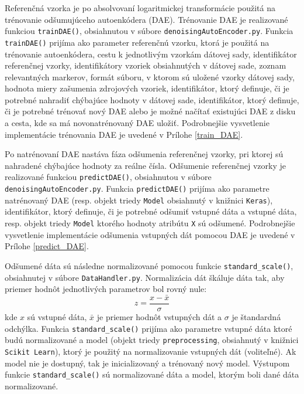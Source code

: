 Referenčná vzorka je po absolvovaní logaritmickej transformácie použitá na trénovanie odšumujúceho autoenkódera (DAE). Trénovanie DAE je realizované funkciou \texttt{trainDAE()}, obsiahnutou v súbore \texttt{denoisingAutoEncoder.py}. Funkcia \texttt{trainDAE()} prijíma ako parameter referenčnú vzorku, ktorá je použitá na trénovanie autoenkódera, cestu k jednotlivým vzorkám dátovej sady, identifikátor referenčnej vzorky, identifikátory vzoriek obsiahnutých v dátovej sade, zoznam relevantných markerov, formát súboru, v ktorom sú uložené vzorky dátovej sady, hodnota miery zašumenia zdrojových vzoriek, identifikátor, ktorý definuje, či je potrebné nahradiť chýbajúce hodnoty v dátovej sade, identifikátor, ktorý definuje, či je potrebné trénovať nový DAE alebo je možné načítať existujúci DAE z disku a cesta, kde sa má novonatrénovaný DAE uložiť. Podrobnejšie vysvetlenie implementácie trénovania DAE je uvedené v Prílohe \ref{train_DAE}. 

Po natrénovaní DAE nastáva fáza odšumenia referenčnej vzorky, pri ktorej sú nahradené chýbajúce hodnoty za reálne čísla. Odšumenie referenčnej vzorky je realizované funkciou \texttt{predictDAE()}, obsiahnutou v súbore \texttt{denoisingAutoEncoder.py}.  Funkcia \texttt{predictDAE()} prijíma ako parametre natrénovaný DAE (resp. objekt triedy \texttt{Model} obsiahnutý v knižnici \texttt{Keras}), identifikátor, ktorý definuje, či je potrebné odšumiť vstupné dáta a vstupné dáta, resp. objekt triedy \texttt{Model} ktorého hodnoty atribútu \texttt{X} sú odšumené. Podrobnejšie vysvetlenie implementácie odšumenia vstupných dát pomocou DAE je uvedené v Prílohe \ref{predict_DAE}. 
 
Odšumené dáta sú následne normalizované pomocou funkcie \texttt{standard_scale()}, obsiahnutej v súbore \texttt{DataHandler.py}. Normalizácia dát škáluje dáta tak, aby priemer hodnôt jednotlivých parametrov bol rovný nule:
\[
z = \frac{x-\bar{x}}{\sigma}
\]
kde $x$ sú vstupné dáta, $\bar{x}$ je priemer hodnôt vstupných dát a $\sigma$ je štandardná odchýlka. Funkcia \texttt{standard_scale()} prijíma ako parametre vstupné dáta ktoré budú normalizované a model (objekt triedy \texttt{preprocessing}, obsiahnutý v knižnici \texttt{Scikit Learn}), ktorý je použitý na normalizovanie vstupných dát (voliteľné). Ak model nie je dostupný, tak je inicializovaný a trénovaný nový model. Výstupom funkcie \texttt{standard_scale()} sú normalizované dáta a model, ktorým boli dané dáta normalizované.

